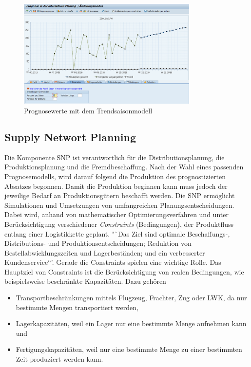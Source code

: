 \begin{figure}[h]
	\centering
	\includegraphics[width=0.8\textwidth]{../pics/lineare_sainsonal_regressionamodell_nko}
	\caption{Prognosewerte mit dem Trendsaisonmodell}
	\label{fig:trend_sais}
\end{figure}



\subsection{Supply Networt Planning}
Die Komponente \ac{SNP} ist verantwortlich für die Distributionsplanung, die Produktionsplanung und die Fremdbeschaffung. \cite[Abschnitt 4.3.4, Seite 1]{scm:script_17_1}
Nach der Wahl eines passenden Prognosemodells, wird darauf folgend die Produktion des prognostizierten Absatzes begonnen. Damit die Produktion beginnen kann muss jedoch der jeweilige Bedarf an Produktionsgütern beschafft werden. 
Die \ac{SNP} ermöglicht Simulationen und Umsetzungen von umfangreichen Planungsentscheidungen. Dabei wird, anhand von mathematischer Optimierungsverfahren und unter Berücksichtigung verschiedener \textit{Constraints} (Bedingungen), der Produktfluss entlang einer Logistikkette geplant. "`Das Ziel sind optimale Beschaffungs-,  Distributions- und Produktionsentscheidungen; Reduktion von Bestellabwicklungszeiten und Lagerbeständen; und ein verbesserter Kundenservice“'\cite{scm:snp_8}.
Gerade die Constraints spielen eine wichtige Rolle. Das Hauptziel von Constraints ist die Berücksichtigung von realen  Bedingungen, wie beispielsweise beschränkte Kapazitäten. Dazu gehören \cite[Abschnitt 4.3.4, Seite 1 f]{scm:script_17_1}
\begin{itemize}
	\item Transportbeschränkungen mittels Flugzeug, Frachter, Zug oder LWK, da nur bestimmte Mengen transportiert werden, 
	\item Lagerkapazitäten, weil ein Lager nur eine bestimmte Menge aufnehmen kann und 
	\item Fertigungskapazitäten, weil nur eine bestimmte Menge zu einer bestimmten Zeit produziert werden kann.
\end{itemize}

